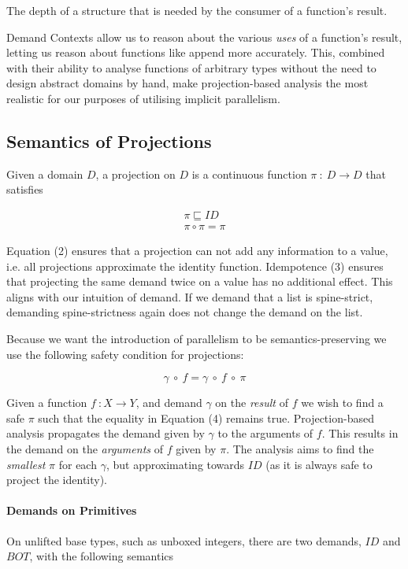            {The depth of a structure that is needed by the consumer of a
            function's result.}

Demand Contexts allow us to reason about the various \emph{uses} of a
function's result, letting us reason about functions like \<append\> more
accurately. This, combined with their ability to analyse functions of arbitrary
types without the need to design abstract domains by hand, make
projection-based analysis the most realistic for our purposes of utilising
implicit parallelism.

\subsection{Semantics of Projections}
\label{sec:projSem}

Given a domain $D$, a projection on $D$ is a continuous function
$\pi \ : \ D \rightarrow D$ that satisfies

\begin{align}
\pi \sqsubseteq ID \\
\pi \circ \pi = \pi
\end{align}

Equation (2) ensures that a projection can not add any information to a value,
i.e. all projections approximate the identity function. Idempotence (3) ensures
that projecting the same demand twice on a value has no additional effect. This
aligns with our intuition of demand. If we demand that a list is spine-strict,
demanding spine-strictness again does not change the demand on the list.

Because we want the introduction of parallelism to be semantics-preserving we
use the following safety condition for projections:

\begin{equation}
\gamma \ \circ \ f = \gamma \ \circ \ f \ \circ \ \pi
\end{equation}

Given a function $f \ : X \rightarrow Y$, and demand $\gamma$ on the
\emph{result} of $f$ we wish to find a safe $\pi$ such that the equality in
Equation (4) remains true. Projection-based analysis propagates the demand
given by $\gamma$ to the arguments of $f$. This results in the demand on the
\emph{arguments} of $f$ given by $\pi$.  The analysis aims to find the
\emph{smallest} $\pi$ for each $\gamma$, but approximating towards $ID$ (as it
is always safe to project the identity).

\paragraph{Demands on Primitives}
On unlifted base types, such as unboxed integers, there are two demands,
$ID$ and $BOT$, with the following semantics


